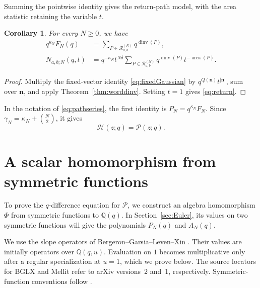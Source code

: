 \documentclass[12pt,reqno]{amsart}
\numberwithin{equation}{section}
\newtheorem{corollary}[theorem]{Corollary}
\theoremstyle{definition}
\theoremstyle{remark}
\theoremstyle{plain}
\newcommand{\QQ}{\mathbb Q}
\newcommand{\nn}{\mathbf n}
\DeclareMathOperator{\area}{area}
\DeclareMathOperator{\dinv}{dinv}
\newcommand{\Hseries}{\mathscr H}
\newcommand{\Pseries}{\mathscr P}
\newcommand{\Rpaths}{\mathcal R_{a,b}^{(N)}}
\begin{document}
Summing the pointwise identity gives the return-path model, with the
area statistic retaining the variable $t$.

\begin{corollary}\label{prop:return}
For every $N\ge0$, we have
\begin{align}
 q^{\kappa_N}F_N(q)&=\sum_{P\in\Rpaths}q^{\dinv(P)},\label{eq:return}\\
 N_{a,b;N}(q,t)&=q^{-\kappa_N}t^{N\delta}
          \sum_{P\in\Rpaths}q^{\dinv(P)}t^{-\area(P)}.\label{eq:returnfull}
\end{align}
\end{corollary}
\begin{proof}
Multiply the fixed-vector identity \eqref{eq:fixedGaussian} by
$q^{Q(\nn)}t^{|\nn|}$, sum over $\nn$, and apply
Theorem~\ref{thm:worddinv}.  Setting $t=1$ gives \eqref{eq:return}.
\end{proof}
In the notation of \eqref{eq:pathseries}, the first identity is
$P_N=q^{\kappa_N}F_N$.  Since
$\gamma_N=\kappa_N+\binom N2$, it gives
\begin{equation}\label{eq:HP}
 \Hseries(z;q)=\Pseries(z;q).
\end{equation}




\section{A scalar homomorphism from symmetric functions}\label{sec:shuffle}
To prove the $q$-difference equation for $\Pseries$, we construct an
algebra homomorphism $\Phi$ from symmetric functions to $\QQ(q)$.
In Section~\ref{sec:Euler}, its values on two symmetric functions will
give the polynomials $P_N(q)$ and $A_N(q)$.

We use the slope operators of Bergeron--Garsia--Leven--Xin
\cite{BGLX}.  Their values are initially operators over $\QQ(q,u)$.
Evaluation on $1$ becomes multiplicative only after a regular
specialization at $u=1$, which we prove below.
The source locators for BGLX and Mellit refer to arXiv versions~2 and~1,
respectively.  Symmetric-function conventions follow
\cite[Chapter~I, Sections~2--4]{Macdonald}.
\end{document}
